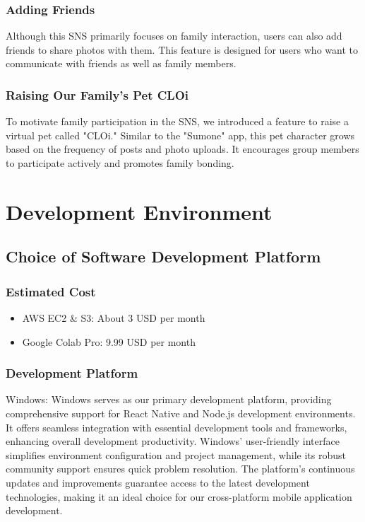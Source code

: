 \documentclass[conference]{IEEEtran}
\begin{document}
        \subsubsection{Adding Friends}
            Although this SNS primarily focuses on family interaction, users can also add friends to share photos with them. This feature is designed for users who want to communicate with friends as well as family members.

        \subsubsection{Raising Our Family's Pet CLOi}
            To motivate family participation in the SNS, we introduced a feature to raise a virtual pet called "CLOi." Similar to the "Sumone" app, this pet character grows based on the frequency of posts and photo uploads. It encourages group members to participate actively and promotes family bonding.

\section{Development Environment}
    \subsection{Choice of Software Development Platform}
        \subsubsection{Estimated Cost}
            \begin{itemize}
                \item AWS EC2 \& S3: About 3 USD per month
                \item Google Colab Pro: 9.99 USD per month
            \end{itemize}
        
        \subsubsection{Development Platform}
            \begin{description}
                \item{Windows:}
                    Windows serves as our primary development platform, providing comprehensive support for React Native and Node.js development environments. It offers seamless integration with essential development tools and frameworks, enhancing overall development productivity. Windows' user-friendly interface simplifies environment configuration and project management, while its robust community support ensures quick problem resolution. The platform's continuous updates and improvements guarantee access to the latest development technologies, making it an ideal choice for our cross-platform mobile application development.
            \end{description}
\end{document}
